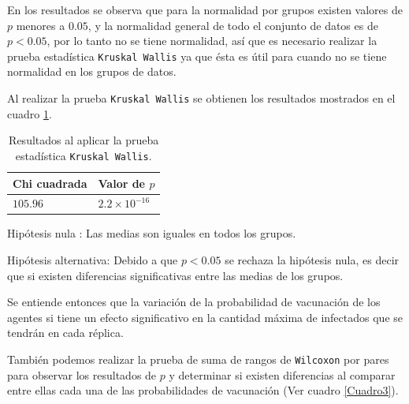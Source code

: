 \documentclass{article}
\begin{document}
En los resultados se observa que para la normalidad por grupos existen valores de $p$ menores a $0.05$, y la normalidad general de todo el conjunto de datos es de $p < 0.05$, por lo tanto no se tiene normalidad, así que es necesario realizar la prueba estadística \texttt{Kruskal Wallis} ya que ésta es útil para cuando no se tiene normalidad en los grupos de datos.
\bigskip

Al realizar la prueba \texttt{Kruskal Wallis} se obtienen los resultados mostrados en el cuadro \ref{Cuadro2}.

\begin{table}[ht]
\centering
\caption{Resultados al aplicar la prueba estadística \texttt{Kruskal Wallis}.}
\smallskip

\begin{tabular}{ |p{2.1cm}|p{2.1cm}|}
 \hline
 Chi cuadrada & Valor de $p$ \\
 \hline
 $105.96$ & $2.2\times 10^{-16}$ \\
 \hline
\end{tabular}
\label{Cuadro2}
\end{table}

Hipótesis nula : Las medias son iguales en todos los grupos.
\smallskip

Hipótesis alternativa: Debido a que $p < 0.05$ se rechaza la hipótesis nula, es decir que si existen diferencias significativas entre las medias de los grupos. 
\smallskip

Se entiende entonces que la variación de la probabilidad de vacunación de los agentes si tiene un efecto significativo en la cantidad máxima de infectados que se tendrán en cada réplica.
\bigskip

También podemos realizar la prueba de suma de rangos de \texttt{Wilcoxon} por pares \citep{4} para observar los resultados de $p$ y determinar si existen diferencias al comparar entre ellas cada una de las probabilidades de vacunación (Ver cuadro \ref{Cuadro3}).
\end{document}
